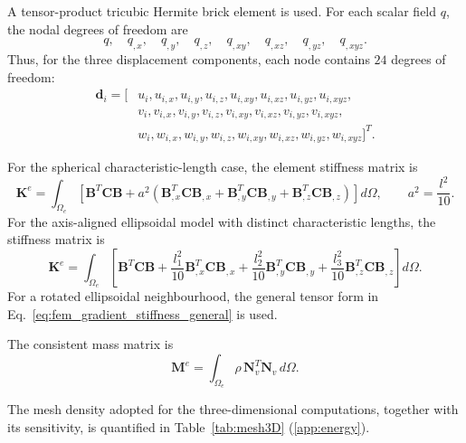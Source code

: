 \documentclass[final,3p,times,fleqn]{elsarticle}
\begin{document}
A tensor-product tricubic Hermite brick element is used. For each scalar
field $q$, the nodal degrees of freedom are
\begin{equation}
\label{eq:3d_scalar_hermite_dofs}
q,
\quad
q_{,x},
\quad
q_{,y},
\quad
q_{,z},
\quad
q_{,xy},
\quad
q_{,xz},
\quad
q_{,yz},
\quad
q_{,xyz}.
\end{equation}
Thus, for the three displacement components, each node contains
$24$ degrees of freedom:
\begin{equation}
\label{eq:3d_hermite_dofs_fem}
\begin{aligned}
\mathbf{d}_i=[&
u_i,u_{i,x},u_{i,y},u_{i,z},u_{i,xy},u_{i,xz},u_{i,yz},u_{i,xyz},\\
&
v_i,v_{i,x},v_{i,y},v_{i,z},v_{i,xy},v_{i,xz},v_{i,yz},v_{i,xyz},\\
&
w_i,w_{i,x},w_{i,y},w_{i,z},w_{i,xy},w_{i,xz},w_{i,yz},w_{i,xyz}
]^T .
\end{aligned}
\end{equation}

For the spherical characteristic-length case, the element stiffness matrix is
\begin{equation}
\label{eq:3d_hermite_stiffness_isotropic}
\mathbf{K}^{e}
=
\int_{\Omega_e}
\left[
\mathbf{B}^{T}\mathbf{C}\mathbf{B}
+
a^2
\left(
\mathbf{B}_{,x}^{T}\mathbf{C}\mathbf{B}_{,x}
+
\mathbf{B}_{,y}^{T}\mathbf{C}\mathbf{B}_{,y}
+
\mathbf{B}_{,z}^{T}\mathbf{C}\mathbf{B}_{,z}
\right)
\right]d\Omega,
\qquad
a^2=\frac{l^2}{10}.
\end{equation}
For the axis-aligned ellipsoidal model with distinct characteristic
lengths, the stiffness matrix is
\begin{equation}
\label{eq:3d_hermite_stiffness_anisotropic}
\mathbf{K}^{e}
=
\int_{\Omega_e}
\left[
\mathbf{B}^{T}\mathbf{C}\mathbf{B}
+
\frac{l_1^2}{10}
\mathbf{B}_{,x}^{T}\mathbf{C}\mathbf{B}_{,x}
+
\frac{l_2^2}{10}
\mathbf{B}_{,y}^{T}\mathbf{C}\mathbf{B}_{,y}
+
\frac{l_3^2}{10}
\mathbf{B}_{,z}^{T}\mathbf{C}\mathbf{B}_{,z}
\right]d\Omega .
\end{equation}
For a rotated ellipsoidal neighbourhood, the general tensor form in
Eq.~\eqref{eq:fem_gradient_stiffness_general} is used.

The consistent mass matrix is
\begin{equation}
\label{eq:3d_hermite_mass}
\mathbf{M}^{e}
=
\int_{\Omega_e}
\rho\,\mathbf{N}_v^T\mathbf{N}_v\,d\Omega .
\end{equation}

The mesh density adopted for the three-dimensional computations,
together with its sensitivity, is quantified in
Table~\ref{tab:mesh3D} (\ref{app:energy}).
\end{document}
